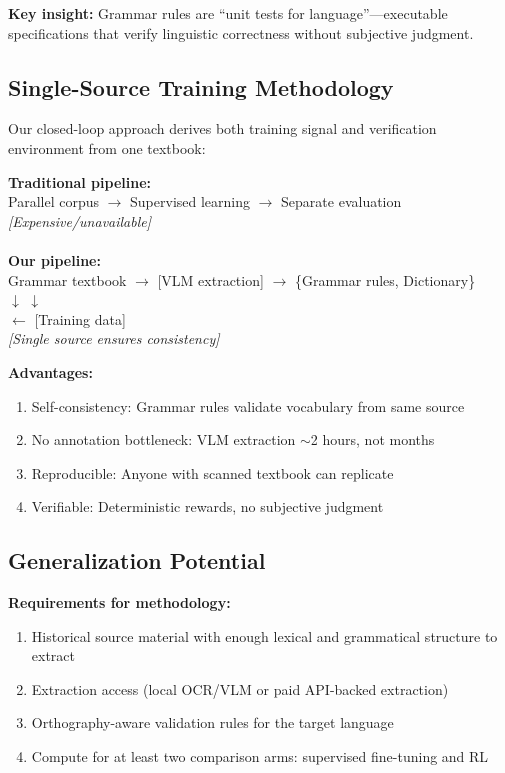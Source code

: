 \documentclass{article}
\begin{document}
\textbf{Key insight:} Grammar rules are ``unit tests for language''---executable specifications that verify linguistic correctness without subjective judgment.

\subsection{Single-Source Training Methodology}

Our closed-loop approach derives both training signal and verification environment from one textbook:

\begin{center}
\textbf{Traditional pipeline:} \\
Parallel corpus $\rightarrow$ Supervised learning $\rightarrow$ Separate evaluation \\
\textit{[Expensive/unavailable] \quad\quad\quad\quad{}} \\
\\
\textbf{Our pipeline:} \\
Grammar textbook $\rightarrow$ [VLM extraction] $\rightarrow$ \{Grammar rules, Dictionary\} \\
\quad\quad\quad\quad\quad\quad\quad\quad\quad\quad\quad $\downarrow$ \quad\quad\quad\quad\quad\quad\quad\quad $\downarrow$ \\
\quad\quad\quad\quad\quad\quad\quad\quad\quad\quad [RL verification] $\leftarrow$ [Training data] \\
\textit{[Single source ensures consistency]}
\end{center}

\textbf{Advantages:}
\begin{enumerate}
    \item Self-consistency: Grammar rules validate vocabulary from same source
    \item No annotation bottleneck: VLM extraction $\sim$2 hours, not months
    \item Reproducible: Anyone with scanned textbook can replicate
    \item Verifiable: Deterministic rewards, no subjective judgment
\end{enumerate}

\subsection{Generalization Potential}

\textbf{Requirements for methodology:}
\begin{enumerate}
    \item Historical source material with enough lexical and grammatical structure to extract
    \item Extraction access (local OCR/VLM or paid API-backed extraction)
    \item Orthography-aware validation rules for the target language
    \item Compute for at least two comparison arms: supervised fine-tuning and RL
\end{enumerate}
\end{document}
